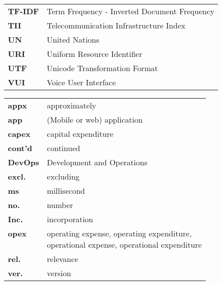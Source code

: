 \begin{flushleft}
\begin{tabular}{ll}
\textbf{TF-IDF}	&	Term Frequency - Inverted Document Frequency\\
\textbf{TII}	&	Telecommunication Infrastructure Index\\

\textbf{UN}		&	United Nations\\
\textbf{URI}		&	Uniform Resource Identifier\\
\textbf{UTF} & Unicode Transformation Format\\

\textbf{VUI}	&	Voice User Interface\\




\end{tabular}
\end{flushleft}


\begin{flushleft}
	\begin{tabular}{ll}
		
\textbf{appx}	&	approximately\\
\textbf{app}	&	(Mobile or web) application\\
\textbf{capex}	&	capital expenditure\\
\textbf{cont'd}	&	continued\\
\textbf{DevOps}	&	Development and Operations\\
\textbf{excl.}	& 	excluding\\
\textbf{ms}	& 	millisecond\\

\textbf{no.}	& 	number\\

\textbf{Inc.}	&	incorporation\\
\shortstack[l]{\textbf{opex} \\ \textcolor{white}{text}}	& 	\shortstack[l]{operating expense, operating expenditure,\\ operational expense, operational expenditure} \\
\textbf{rel.}	&	relevance\\
\textbf{ver.}	& 	version \\
\end{tabular}
\end{flushleft}


